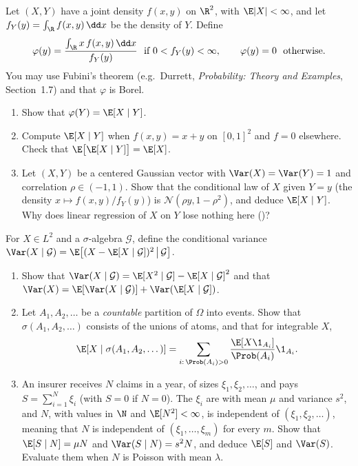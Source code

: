 \begin{exercise}\label{ex:pr-density}
\medium Let $(X,Y)$ have a joint density $f(x,y)$ on $\R^2$, with $\E|X|<\infty$, and let
$f_Y(y)=\int_\R f(x,y)\,\dd x$ be the density of $Y$. Define
\[
  \varphi(y)=\frac{\int_\R x\,f(x,y)\,\dd x}{f_Y(y)}\ \text{ if }0<f_Y(y)<\infty,\qquad
  \varphi(y)=0\ \text{ otherwise}.
\]
You may use Fubini's theorem (e.g.\ Durrett, \emph{Probability: Theory and Examples},
Section~1.7) and that $\varphi$ is Borel.
\begin{enumerate}[label=(\alph*)]
  \item Show that $\varphi(Y)=\E[X\mid Y]$.
  \item Compute $\E[X\mid Y]$ when $f(x,y)=x+y$ on $[0,1]^2$ and $f=0$ elsewhere. Check that
    $\E\big[\E[X\mid Y]\big]=\E[X]$.
  \item Let $(X,Y)$ be a centered Gaussian vector with $\Var(X)=\Var(Y)=1$ and correlation
    $\rho\in(-1,1)$. Show that the conditional law of $X$ given $Y=y$ (the density
    $x\mapsto f(x,y)/f_Y(y)$) is $\mathcal N(\rho y,1-\rho^2)$, and deduce $\E[X\mid Y]$. Why
    does linear regression of $X$ on $Y$ lose nothing here
    ()?
\end{enumerate}
\end{exercise}

\begin{exercise}\label{ex:pr-conditional-variance}
\medium For $X\in L^2$ and a $\sigma$-algebra $\mathcal G$, define the conditional variance
$\Var(X\mid\mathcal G)=\E\big[(X-\E[X\mid\mathcal G])^2\,\big|\,\mathcal G\big]$.
\begin{enumerate}[label=(\alph*)]
  \item Show that $\Var(X\mid\mathcal G)=\E[X^2\mid\mathcal G]-\E[X\mid\mathcal G]^2$ and that
    $\Var(X)=\E[\Var(X\mid\mathcal G)]+\Var(\E[X\mid\mathcal G])$.
  \item Let $A_1,A_2,\dots$ be a \emph{countable} partition of $\Omega$ into events. Show that
    $\sigma(A_1,A_2,\dots)$ consists of the unions of atoms, and that for integrable $X$,
    \[
      \E[X\mid\sigma(A_1,A_2,\dots)]=\sum_{i:\,\Prob(A_i)>0}\frac{\E[X\1_{A_i}]}{\Prob(A_i)}\1_{A_i}.
    \]
  \item An insurer receives $N$ claims in a year, of sizes $\xi_1,\xi_2,\dots$, and pays
    $S=\sum_{i=1}^N\xi_i$ (with $S=0$ if $N=0$). The $\xi_i$ are \iid with mean $\mu$ and variance
    $s^2$, and $N$, with values in $\N$ and $\E[N^2]<\infty$, is independent of
    $(\xi_1,\xi_2,\dots)$, meaning that $N$ is independent of $(\xi_1,\dots,\xi_m)$ for every
    $m$. Show that $\E[S\mid N]=\mu N$ and $\Var(S\mid N)=s^2N$, and deduce $\E[S]$ and
    $\Var(S)$. Evaluate them when $N$ is Poisson with mean $\lambda$.
\end{enumerate}
\end{exercise}

